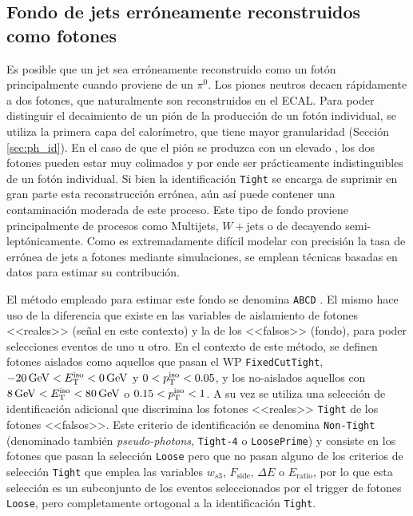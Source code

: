 \subsection{Fondo de jets erróneamente reconstruidos como fotones}\label{sec:jfakes}

Es posible que un jet sea erróneamente reconstruido como un fotón principalmente cuando proviene de un $\pi^0$. Los piones neutros decaen rápidamente a dos fotones, que naturalmente son reconstruidos en el ECAL. Para poder distinguir el decaimiento de un pión de la producción de un fotón individual, se utiliza la primera capa del calorímetro, que tiene mayor granularidad (Sección \ref{sec:ph_id}). En el caso de que el pión se produzca con un elevado \pt, los dos fotones pueden estar muy colimados y por ende ser prácticamente indistinguibles de un fotón individual. Si bien la identificación \texttt{Tight} se encarga de suprimir en gran parte esta reconstrucción errónea, aún así puede contener una contaminación moderada de este proceso. Este tipo de fondo proviene principalmente de procesos como Multijets, $W+\text{jets}$ o de \ttbar decayendo semi-leptónicamente. 
Como es extremadamente difícil modelar con precisión la tasa de errónea de jets a fotones mediante simulaciones, se emplean técnicas basadas en datos para estimar su contribución.


El método empleado para estimar este fondo se denomina \texttt{ABCD} \cite{Alonso:2233238}. El mismo hace uso de la diferencia que existe en las variables de aislamiento de fotones <<reales>> (señal en este contexto) y la de los <<falsos>> (fondo), para poder selecciones eventos de uno u otro.
En el contexto de este método, se definen fotones aislados como aquellos que pasan el WP \texttt{FixedCutTight},
 $-20\,\text{GeV}<E_{\text{T}}^{\text{iso}}<0\,\text{GeV}$ y $0<p_{\text{T}}^{\text{iso}}<0.05$, y los no-aislados aquellos con $8\,\text{GeV}<E_{\text{T}}^{\text{iso}}<80\,\text{GeV}$ o $0.15<p_{\text{T}}^{\text{iso}}<1$.
A su vez se utiliza una selección de identificación adicional que discrimina los fotones <<reales>> \texttt{Tight} de los fotones <<falsos>>. Este criterio de identificación se denomina \texttt{Non-Tight} (denominado también \textit{pseudo-photons}, \texttt{Tight-4} o \texttt{LoosePrime}) y consiste en los fotones que pasan la selección \texttt{Loose} pero que no pasan alguno de los criterios de selección \texttt{Tight} que emplea las variables $w_{s3}$, $F_{\text{side}}$, $\Delta E$ o $E_{\text{ratio}}$, por lo que esta selección es un subconjunto de los eventos seleccionados por el trigger de fotones \texttt{Loose}, pero completamente ortogonal a la identificación \texttt{Tight}. 

